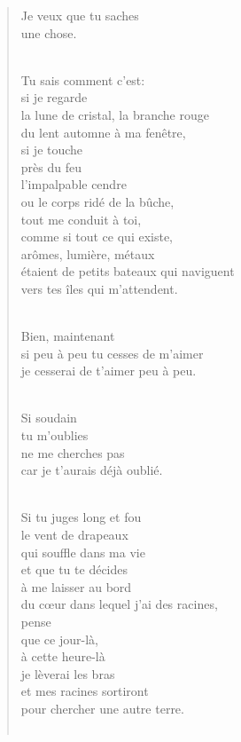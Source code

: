\documentclass[11pt,a4paper]{book}
\begin{document}
\begin{verse}
Je veux que tu saches \\
une chose. \\ \

Tu sais comment c'est: \\
si je regarde \\
la lune de cristal, la branche rouge \\
du lent automne à ma fenêtre, \\
si je touche \\
près du feu \\
l'impalpable cendre \\
ou le corps ridé de la bûche, \\
tout me conduit à toi, \\
comme si tout ce qui existe, \\
arômes, lumière, métaux \\
étaient de petits bateaux qui naviguent \\
vers tes îles qui m'attendent. \\ \

Bien, maintenant \\
si peu à peu tu cesses de m'aimer \\
je cesserai de t'aimer peu à peu. \\ \

Si soudain \\
tu m'oublies \\
ne me cherches pas \\
car je t'aurais déjà oublié. \\ \

Si tu juges long et fou \\
le vent de drapeaux \\
qui souffle dans ma vie \\
et que tu te décides \\
à me laisser au bord \\
du c{\oe}ur dans lequel j'ai des racines, \\
pense \\
que ce jour-là, \\
à cette heure-là \\
je lèverai les bras \\
et mes racines sortiront \\
pour chercher une autre terre. \\ \

\newpage


\end{verse}
\end{document}
